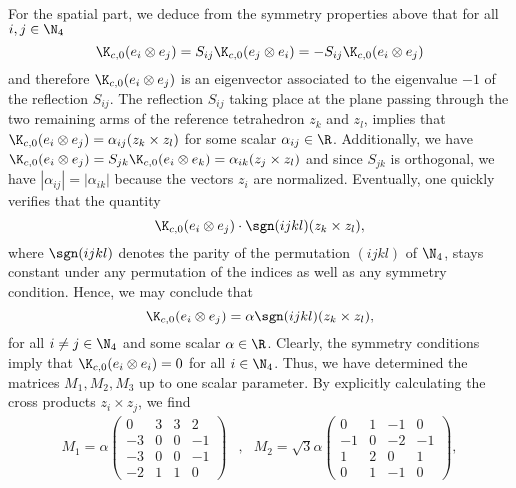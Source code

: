 For the spatial part, we deduce from the symmetry properties above that for all $i, j \in \N_4$	
\begin{equation}
	\K_{c,0}(e_i \otimes e_j) = S_{ij} \K_{c,0}(e_j \otimes e_i) = -S_{ij} \K_{c,0}(e_i \otimes e_j)
\end{equation}
and therefore $\K_{c,0}(e_i \otimes e_j)$ is an eigenvector associated to the eigenvalue $-1$ of the reflection $S_{ij}$. The reflection $S_{ij}$ taking place at the plane passing through the two remaining arms of the reference tetrahedron $z_k$ and $z_l$, implies that $\K_{c,0}(e_i \otimes e_j) = \alpha_{ij}( z_k \times z_l)$ for some scalar $\alpha_{ij} \in \R$. Additionally, we have $\K_{c,0}(e_i \otimes e_j) = S_{jk} \K_{c,0}(e_i \otimes e_k) = \alpha_{ik}(z_j \times z_l)$ and since $S_{jk}$ is orthogonal, we have $|\alpha_{ij}| = |\alpha_{ik}|$ because the vectors $z_i$ are normalized. Eventually, one quickly verifies that the quantity
\begin{equation}
	\K_{c,0}(e_i \otimes e_j) \cdot \sgn(ijkl) (z_k \times z_l),
\end{equation}
where $\sgn(ijkl)$ denotes the parity of the permutation $(ijkl)$ of $\N_4$, stays constant under any permutation of the indices as well as any symmetry condition. Hence, we may conclude that
\begin{equation}
	\K_{c,0}(e_i \otimes e_j) = \alpha \sgn(ijkl) (z_k \times z_l),
\end{equation}
for all $i \neq j \in \N_4$ and some scalar $\alpha \in \R$. Clearly, the symmetry conditions imply that $\K_{c,0}(e_i \otimes e_i) = 0$ for all $i \in  \N_4$. Thus, we have determined the matrices $M_1, M_2, M_3$ up to one scalar parameter. By explicitly calculating the cross products $z_i \times z_j$, we find
\renewcommand{\arraystretch}{1.1}
\begin{align}
\label{eq: M1 and M2}
M_1 = \alpha \left ( \begin{array}{cccc}
0 & 3 & 3 & 2 \\ 
-3 & 0 & 0 & -1 \\ 
-3 & 0 & 0 & -1 \\ 
-2 & 1 & 1 & 0
\end{array} \right ) &, &
M_2 = \sqrt{3} \alpha \left (
\begin{array}{cccc}
0 & 1 & -1 & 0 \\ 
-1 & 0 & -2 & -1 \\ 
1 & 2 & 0 & 1 \\ 
0 & 1 & -1 & 0
\end{array} \right),
\end{align}
